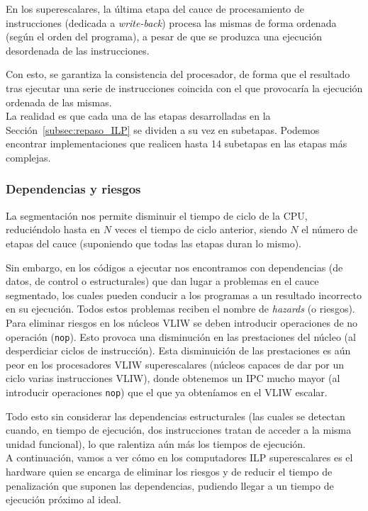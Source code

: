 En los superescalares, la última etapa del cauce de procesamiento de instrucciones (dedicada a \emph{write-back}) procesa las mismas de forma ordenada (según el orden del programa), a pesar de que se produzca una ejecución desordenada de las instrucciones.

Con esto, se garantiza la consistencia del procesador, de forma que el resultado tras ejecutar una serie de instrucciones coincida con el que provocaría la ejecución ordenada de las mismas.\\

La realidad es que cada una de las etapas desarrolladas en la Sección~\ref{subsec:repaso_ILP} se dividen a su vez en subetapas. Podemos encontrar implementaciones que realicen hasta 14 subetapas en las etapas más complejas.

\subsubsection{Dependencias y riesgos}
La segmentación nos permite disminuir el tiempo de ciclo de la CPU, reduciéndolo hasta en $N$ veces el tiempo de ciclo anterior, siendo $N$ el número de etapas del cauce (suponiendo que todas las etapas duran lo mismo).

Sin embargo, en los códigos a ejecutar nos encontramos con dependencias (de datos, de control o estructurales) que dan lugar a problemas en el cauce segmentado, los cuales pueden conducir a los programas a un resultado incorrecto en su ejecución. Todos estos problemas reciben el nombre de \emph{hazards} (o riesgos).\\

Para eliminar riesgos en los núcleos VLIW se deben introducir operaciones de no operación (\verb|nop|). Esto provoca una disminución en las prestaciones del núcleo (al desperdiciar ciclos de instrucción). Esta disminuición de las prestaciones es aún peor en los procesadores VLIW superescalares (núcleos capaces de dar por un ciclo varias instrucciones VLIW), donde obtenemos un IPC mucho mayor (al introducir operaciones \verb|nop|) que el que ya obteníamos en el VLIW escalar.

Todo esto sin considerar las dependencias estructurales (las cuales se detectan cuando, en tiempo de ejecución, dos instrucciones tratan de acceder a la misma unidad funcional), lo que ralentiza aún más los tiempos de ejecución.\\

A continuación, vamos a ver cómo en los computadores ILP superescalares es el hardware quien se encarga de eliminar los riesgos y de reducir el tiempo de penalización que suponen las dependencias, pudiendo llegar a un tiempo de ejecución próximo al ideal.

